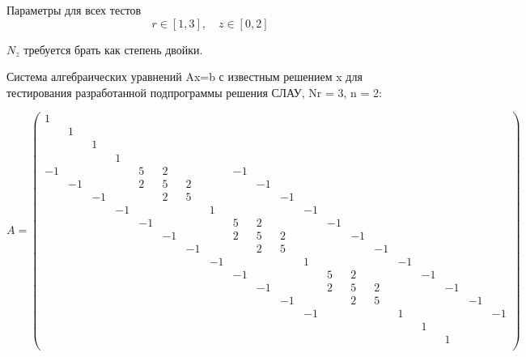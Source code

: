 Параметры для всех тестов
\[ r \in [1, 3], \quad z \in [0, 2] \]

$N_z$ требуется брать как степень двойки.

Система алгебраических уравнений Ax=b с известным решением x для тестирования разработанной подпрограммы решения СЛАУ, Nr = 3, n = 2:
\begin{tiny}
\[ A = \begin{pmatrix}
  1 &   &   &   &   &   &   &   &   &   &   &   &   &   &   &   &   &   &   &  \\
    & 1 &   &   &   &   &   &   &   &   &   &   &   &   &   &   &   &   &   &  \\
    &   & 1 &   &   &   &   &   &   &   &   &   &   &   &   &   &   &   &   &  \\
    &   &   & 1 &   &   &   &   &   &   &   &   &   &   &   &   &   &   &   &  \\
  -1 &   &   &   & 5 & 2 &   &   & -1 &   &   &   &   &   &   &   &   &   &   &  \\
    & -1 &   &   & 2 & 5 & 2 &   &   & -1 &   &   &   &   &   &   &   &   &   &  \\
    &   & -1 &   &   & 2 & 5 &   &   &   & -1 &   &   &   &   &   &   &   &   &  \\
    &   &   & -1 &   &   &   & 1 &   &   &   & -1 &   &   &   &   &   &   &   &  \\
    &   &   &   & -1 &   &   &   & 5 & 2 &   &   & -1 &   &   &   &   &   &   &  \\
    &   &   &   &   & -1 &   &   & 2 & 5 & 2 &   &   & -1 &   &   &   &   &   &  \\
    &   &   &   &   &   & -1 &   &   & 2 & 5 &   &   &   & -1 &   &   &   &   &  \\
    &   &   &   &   &   &   & -1 &   &   &   & 1 &   &   &   & -1 &   &   &   &  \\
    &   &   &   &   &   &   &   & -1 &   &   &   & 5 & 2 &   &   & -1 &   &   &  \\
    &   &   &   &   &   &   &   &   & -1 &   &   & 2 & 5 & 2 &   &   & -1 &   &  \\
    &   &   &   &   &   &   &   &   &   & -1 &   &   & 2 & 5 &   &   &   & -1 &  \\
    &   &   &   &   &   &   &   &   &   &   & -1 &   &   &   & 1 &   &   &   & -1\\
    &   &   &   &   &   &   &   &   &   &   &   &   &   &   &   & 1 &   &   &  \\
    &   &   &   &   &   &   &   &   &   &   &   &   &   &   &   &   & 1 &   &  \\

\end{pmatrix}\]
\end{tiny}
